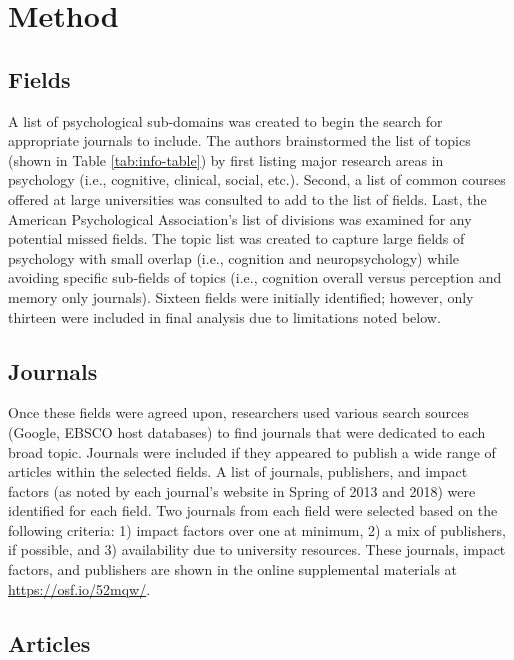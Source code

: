 \documentclass[english,,man,mask]{apa6}
\theoremstyle{definition}
\theoremstyle{definition}
\theoremstyle{definition}
\theoremstyle{remark}
\begin{document}
\section{Method}\label{method}

\subsection{Fields}\label{fields}

A list of psychological sub-domains was created to begin the search for
appropriate journals to include. The authors brainstormed the list of
topics (shown in Table \ref{tab:info-table}) by first listing major
research areas in psychology (i.e., cognitive, clinical, social, etc.).
Second, a list of common courses offered at large universities was
consulted to add to the list of fields. Last, the American Psychological
Association's list of divisions was examined for any potential missed
fields. The topic list was created to capture large fields of psychology
with small overlap (i.e., cognition and neuropsychology) while avoiding
specific sub-fields of topics (i.e., cognition overall versus perception
and memory only journals). Sixteen fields were initially identified;
however, only thirteen were included in final analysis due to
limitations noted below.

\subsection{Journals}\label{journals}

Once these fields were agreed upon, researchers used various search
sources (Google, EBSCO host databases) to find journals that were
dedicated to each broad topic. Journals were included if they appeared
to publish a wide range of articles within the selected fields. A list
of journals, publishers, and impact factors (as noted by each journal's
website in Spring of 2013 and 2018) were identified for each field. Two
journals from each field were selected based on the following criteria:
1) impact factors over one at minimum, 2) a mix of publishers, if
possible, and 3) availability due to university resources. These
journals, impact factors, and publishers are shown in the online
supplemental materials at \url{https://osf.io/52mqw/}.

\subsection{Articles}\label{articles}
\end{document}
